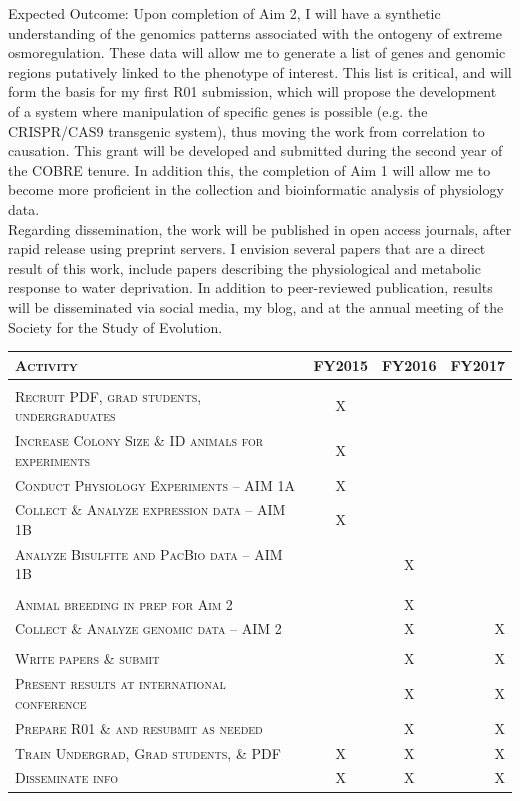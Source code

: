 \documentclass[11pt]{article}
\begin{document}
Expected Outcome: Upon completion of Aim 2, I will have a synthetic understanding of the genomics patterns associated with the ontogeny of extreme osmoregulation. These data will allow me to generate a list of genes and genomic regions putatively linked to the phenotype of interest. This list is critical, and will form the basis for my first R01 submission, which will propose the development of a system where manipulation of specific genes is possible (e.g. the CRISPR/CAS9 transgenic system), thus moving the work from correlation to causation. This grant will be developed and submitted during the second year of the COBRE tenure. In addition this, the completion of Aim 1 will allow me to become more proficient in the collection and bioinformatic analysis of physiology data. \\

Regarding dissemination, the work will be published in open access journals, after rapid release using preprint servers. I envision several papers that are a direct result of this work, include papers describing the physiological and metabolic response to water deprivation. In addition to peer-reviewed publication, results will be disseminated via social media, my blog, and at the annual meeting of the Society for the Study of Evolution. 


\begin{center}
\begin{tabular}{l|c c r}

\textsc{Activity} & \textsc{FY2015} & \textsc{FY2016} & \textsc{FY2017} \\
\hline \\
\textsc{Recruit PDF, grad students, undergraduates} & X & & \\
\textsc{Increase Colony Size \& ID animals for experiments } & X & & \\
\textsc{Conduct Physiology Experiments -- AIM 1A} & X & & \\
\textsc{Collect \& Analyze expression data -- AIM 1B} & X & & \\
\textsc{Analyze Bisulfite and PacBio data -- AIM 1B} & & X & \\
\textsc{} & &  &   \\
\textsc{Animal breeding in prep for Aim 2} & & X &  \\
\textsc{Collect \& Analyze genomic data -- AIM 2} & & X & X \\
\textsc{} & &  &   \\
\textsc{Write papers \& submit} & & X & X \\
\textsc{Present results at international conference} & & X & X \\
\textsc{Prepare R01 \& and resubmit as needed} & & X & X \\
\textsc{Train Undergrad, Grad students, \& PDF} & X & X & X \\
\textsc{Disseminate info} & X & X & X \\

\end{tabular}
\end{center}
\end{document}

